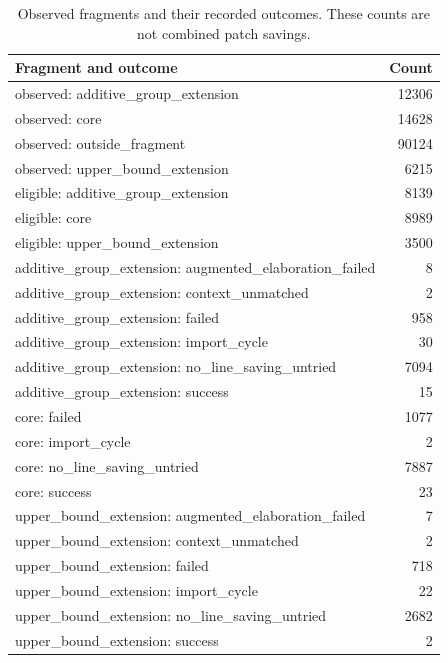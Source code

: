 \begin{table}[!htbp]\centering\small
\caption{Observed fragments and their recorded outcomes. These counts are not combined patch savings.}
\begin{tabular}{lr}\toprule
Fragment and outcome & Count\\\midrule
observed: additive\_group\_extension & 12306\\
observed: core & 14628\\
observed: outside\_fragment & 90124\\
observed: upper\_bound\_extension & 6215\\
eligible: additive\_group\_extension & 8139\\
eligible: core & 8989\\
eligible: upper\_bound\_extension & 3500\\
additive\_group\_extension: augmented\_elaboration\_failed & 8\\
additive\_group\_extension: context\_unmatched & 2\\
additive\_group\_extension: failed & 958\\
additive\_group\_extension: import\_cycle & 30\\
additive\_group\_extension: no\_line\_saving\_untried & 7094\\
additive\_group\_extension: success & 15\\
core: failed & 1077\\
core: import\_cycle & 2\\
core: no\_line\_saving\_untried & 7887\\
core: success & 23\\
upper\_bound\_extension: augmented\_elaboration\_failed & 7\\
upper\_bound\_extension: context\_unmatched & 2\\
upper\_bound\_extension: failed & 718\\
upper\_bound\_extension: import\_cycle & 22\\
upper\_bound\_extension: no\_line\_saving\_untried & 2682\\
upper\_bound\_extension: success & 2\\
\bottomrule\end{tabular}\end{table}
